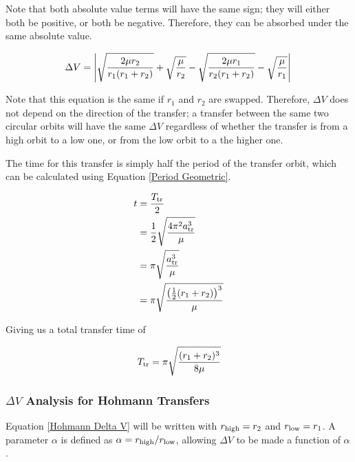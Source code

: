 \documentclass[../basicOrbitalDynamics.tex]{subfiles}
\begin{document}
Note that both absolute value terms will have the same sign; they will either both be positive, or both be negative. Therefore, they can be absorbed under the same absolute value.

\begin{equation}\label{Hohmann Delta V}
    \Delta V = \left|\sqrt{\frac{2\mu{}r_2}{r_1(r_1+r_2)}}+\sqrt{\frac{\mu}{r_2}}-\sqrt{\frac{2\mu{}r_1}{r_2(r_1+r_2)}}-\sqrt{\frac{\mu}{r_1}}\right|\\
\end{equation}

Note that this equation is the same if $r_1$ and $r_2$ are swapped. Therefore, $\Delta V$ does not depend on the direction of the transfer; a transfer between the same two circular orbits will have the same $\Delta V$ regardless of whether the transfer is from a high orbit to a low one, or from the low orbit to a the higher one.

The time for this transfer is simply half the period of the transfer orbit, which can be calculated using Equation  \eqref{Period Geometric}.

\begin{align*}
    t &= \frac{{T}_\text{tr}}{2} \\
 &= \frac{1}{2}\sqrt{\frac{4\pi^2 {a}_\text{tr}^3}{\mu}} \\
 &= \pi\sqrt{\frac{{a}_\text{tr}^3}{\mu}} \\
 &= \pi\sqrt{\frac{\left(\frac{1}{2}(r_1+r_2)\right)^3}{\mu}} \\
\end{align*}

Giving us a total transfer time of

\begin{equation}\label{Hohmann time}
    {T}_\text{tr}=\pi\sqrt{\frac{(r_1+r_2)^3}{8\mu}}
\end{equation}

\subsubsection{\texorpdfstring{$\Delta V$}{DeltaV} Analysis for Hohmann Transfers}\label{sec:DeltaV analysis for Hohmann}

Equation  \eqref{Hohmann Delta V} will be written with ${r}_\text{high}=r_2$ and ${r}_\text{low}=r_1$. A parameter $\alpha$ is defined as $\alpha={r}_\text{high}/{r}_\text{low}$, allowing $\Delta V$ to be made a function of $\alpha$.
\end{document}
